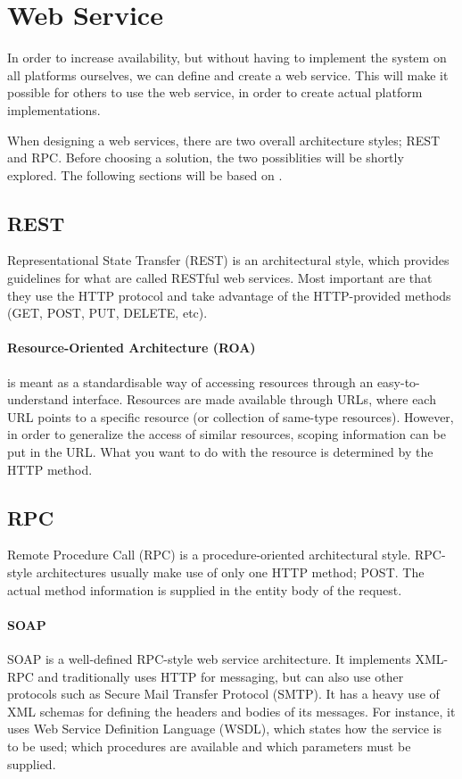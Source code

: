 \section{Web Service}
In order to increase availability, but without having to implement the system on all platforms ourselves, we can define and create a web service.
This will make it possible for others to use the web service, in order to create actual platform implementations.

When designing a web services, there are two overall architecture styles; REST and RPC.
Before choosing a solution, the two possiblities will be shortly explored.
The following sections will be based on \citet{restful_web_services}.

\subsection{REST}
Representational State Transfer (REST) is an architectural style, which provides guidelines for what are called RESTful web services.
Most important are that they use the HTTP protocol\cite{http_specification} and take advantage of the HTTP-provided methods (GET, POST, PUT, DELETE, etc).

\paragraph{Resource-Oriented Architecture (ROA)} is meant as a standardisable way of accessing resources through an easy-to-understand interface.
Resources are made available through URLs, where each URL points to a specific resource (or collection of same-type resources).
However, in order to generalize the access of similar resources, scoping information can be put in the URL.
What you want to do with the resource is determined by the HTTP method.

\subsection{RPC}
Remote Procedure Call (RPC) is a procedure-oriented architectural style.
RPC-style architectures usually make use of only one HTTP method; POST.
The actual method information is supplied in the entity body of the request.

\paragraph{SOAP}
SOAP is a well-defined RPC-style web service architecture.
It implements XML-RPC\cite{xmlrpc_specification} and traditionally uses HTTP for messaging, but can also use other protocols such as Secure Mail Transfer Protocol (SMTP).
It has a heavy use of XML schemas for defining the headers and bodies of its messages.
For instance, it uses Web Service Definition Language (WSDL), which states how the service is to be used; which procedures are available and which parameters must be supplied.


